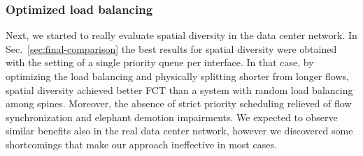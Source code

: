 \subsubsection{Optimized load balancing}
Next, we started to really evaluate spatial diversity in the data center network. In Sec.~\ref{sec:final-comparison} the best results for spatial diversity were obtained with the setting of a single priority queue per interface. In that case, by optimizing the load balancing and physically splitting shorter from longer flows, spatial diversity achieved better FCT than a system with random load balancing among spines. Moreover, the absence of strict priority scheduling relieved of flow synchronization and elephant demotion impairments. We expected to observe similar benefits also in the real data center network, however we discovered some shortcomings that make our approach ineffective in most cases. \\
